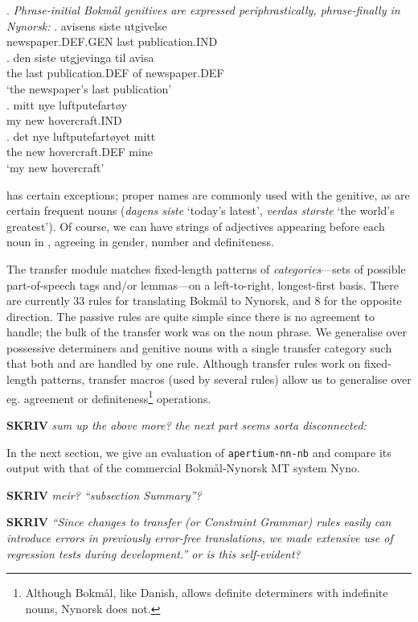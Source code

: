 \documentclass[11pt]{article}
\newcommand{\comment}[1]{\textbf{SKRIV} {\it #1}}
\begin{document}
\ex. \label{posgen} \emph{Phrase-initial Bokmål genitives are expressed
  periphrastically, phrase-finally in Nynorsk:}
\ag. avisens siste utgivelse\\
newspaper.DEF.GEN last publication.IND\\
\bg. den siste utgjevinga til avisa\\
the last publication.DEF of newspaper.DEF\\
`the newspaper's last publication'\\
\cg. mitt nye luftputefartøy\\
my new hovercraft.IND\\
\dg. det nye luftputefartøyet mitt\\
the new hovercraft.DEF mine\\
`my new hovercraft'

\Last has certain exceptions; proper names are commonly used with the
genitive, as are certain frequent nouns (\emph{dagens siste} `today's
latest', \emph{verdas største} `the world's greatest'). Of course, we
can have strings of adjectives appearing before each noun in
\Last[a-d], agreeing in gender, number and definiteness. 

The transfer module matches fixed-length patterns of
\emph{categories}—sets of possible part-of-speech tags and/or
lemmas—on a left-to-right, longest-first basis. There are currently 33
rules for translating Bokmål to Nynorsk, and 8 for the opposite
direction. The passive rules are quite simple since there is no
agreement to handle; the bulk of the transfer work was on the noun
phrase. We generalise over possessive determiners and genitive nouns
with a single transfer category such that both \Last[a-b] and
\Last[c-d] are handled by one rule. Although transfer rules work on
fixed-length patterns, transfer macros (used by several rules) allow
us to generalise over eg. agreement or definiteness\footnote{Although
  Bokmål, like Danish, allows definite determiners with indefinite
  nouns, Nynorsk does not.} operations.

\comment{sum up the above more? the next part seems sorta disconnected:}

In the next section, we give an evaluation of {\tt apertium-nn-nb} and
compare its output with that of the commercial Bokmål-Nynorsk MT
system Nyno.

\comment{ meir? ``subsection Summary''? }

\comment{ ``Since changes to transfer (or Constraint
  Grammar) rules easily can introduce errors in previously error-free
  translations, we made extensive use of regression tests during
  development.'' or is this self-evident?}
\end{document}
